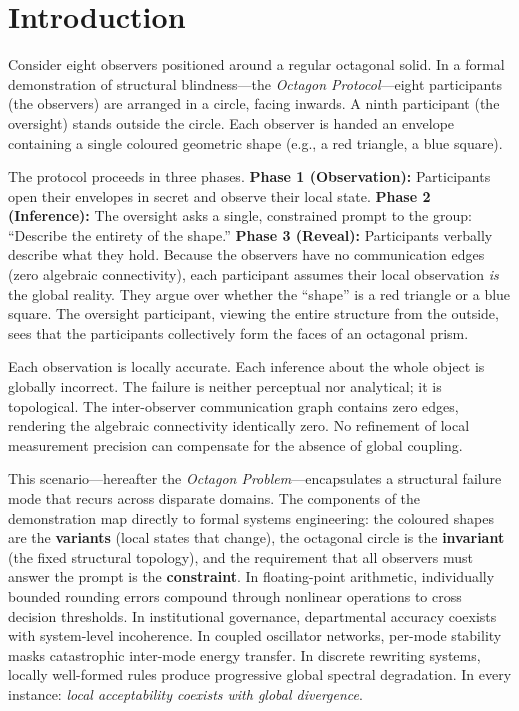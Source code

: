 \documentclass[10pt,twocolumn]{article}
\theoremstyle{definition}
\theoremstyle{remark}
\begin{document}
\section{Introduction}\label{sec:intro}

Consider eight observers positioned around a regular octagonal solid.  In a formal demonstration of structural blindness---the \emph{Octagon Protocol}---eight participants (the observers) are arranged in a circle, facing inwards.  A ninth participant (the oversight) stands outside the circle.  Each observer is handed an envelope containing a single coloured geometric shape (e.g., a red triangle, a blue square).

The protocol proceeds in three phases.  \textbf{Phase 1 (Observation):} Participants open their envelopes in secret and observe their local state.  \textbf{Phase 2 (Inference):} The oversight asks a single, constrained prompt to the group: ``Describe the entirety of the shape.''  \textbf{Phase 3 (Reveal):} Participants verbally describe what they hold.  Because the observers have no communication edges (zero algebraic connectivity), each participant assumes their local observation \emph{is} the global reality.  They argue over whether the ``shape'' is a red triangle or a blue square.  The oversight participant, viewing the entire structure from the outside, sees that the participants collectively form the faces of an octagonal prism.

Each observation is locally accurate.  Each inference about the whole object is globally incorrect.  The failure is neither perceptual nor analytical; it is topological.  The inter-observer communication graph contains zero edges, rendering the algebraic connectivity identically zero.  No refinement of local measurement precision can compensate for the absence of global coupling.

This scenario---hereafter the \emph{Octagon Problem}---encapsulates a structural failure mode that recurs across disparate domains.  The components of the demonstration map directly to formal systems engineering: the coloured shapes are the \textbf{variants} (local states that change), the octagonal circle is the \textbf{invariant} (the fixed structural topology), and the requirement that all observers must answer the prompt is the \textbf{constraint}.  In floating-point arithmetic, individually bounded rounding errors compound through nonlinear operations to cross decision thresholds.  In institutional governance, departmental accuracy coexists with system-level incoherence.  In coupled oscillator networks, per-mode stability masks catastrophic inter-mode energy transfer.  In discrete rewriting systems, locally well-formed rules produce progressive global spectral degradation.  In every instance: \emph{local acceptability coexists with global divergence}.
\end{document}
